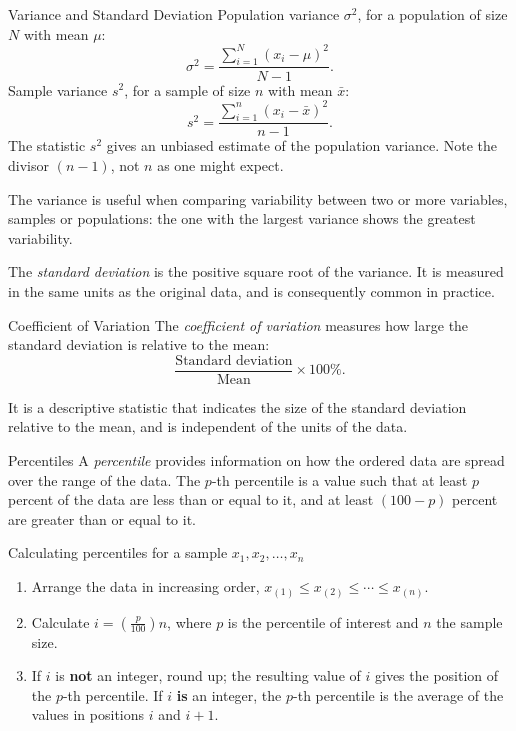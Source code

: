 \documentclass[10pt,aspectratio=169]{beamer}
\begin{document}
\begin{frame}{Variance and Standard Deviation}
  Population variance $\sigma^2$, for a population of size $N$ with mean $\mu$:
  \[
    \sigma^2 = \frac{\sum_{i=1}^{N} (x_i - \mu)^2}{N-1}.
  \]
  Sample variance $s^2$, for a sample of size $n$ with mean $\bar{x}$:
  \[
    s^2 = \frac{\sum_{i=1}^{n} (x_i - \bar{x})^2}{n-1}.
  \]
  The statistic $s^2$ gives an unbiased estimate of the population variance.
  Note the divisor $(n-1)$, not $n$ as one might expect.

  \vspace{0.5em}
  The variance is useful when comparing variability between two or more
  variables, samples or populations: the one with the largest variance shows the
  greatest variability.

  \vspace{0.5em}
  The \emph{standard deviation} is the positive square root of the variance. It
  is measured in the same units as the original data, and is consequently common
  in practice.
\end{frame}

\begin{frame}{Coefficient of Variation}
  The \emph{coefficient of variation} measures how large the standard deviation
  is relative to the mean:
  \[
    \frac{\text{Standard deviation}}{\text{Mean}} \times 100\%.
  \]

  \vspace{1em}
  It is a descriptive statistic that indicates the size of the standard
  deviation relative to the mean, and is independent of the units of the data.
\end{frame}

\begin{frame}{Percentiles}
  A \emph{percentile} provides information on how the ordered data are spread
  over the range of the data. The $p$-th percentile is a value such that at
  least $p$ percent of the data are less than or equal to it, and at least
  $(100-p)$ percent are greater than or equal to it.

  \begin{block}{Calculating percentiles for a sample $x_1, x_2, \ldots, x_n$}
    \begin{enumerate}
      \item Arrange the data in increasing order,
            $x_{(1)} \le x_{(2)} \le \cdots \le x_{(n)}$.
      \item Calculate $i = \left(\frac{p}{100}\right) n$, where $p$ is the
            percentile of interest and $n$ the sample size.
      \item If $i$ is \textbf{not} an integer, round up; the resulting value of
            $i$ gives the position of the $p$-th percentile. If $i$ \textbf{is}
            an integer, the $p$-th percentile is the average of the values in
            positions $i$ and $i+1$.
    \end{enumerate}
  \end{block}
\end{frame}
\end{document}
